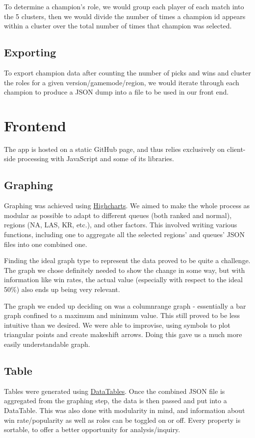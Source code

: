\documentclass{article}
\begin{document}
To determine a champion's role,  we would group each player of each match into the 5 clusters, then we would divide the number of times a champion id appears within a cluster over the total number of times that champion was selected.

\subsection{Exporting}
To export champion data after counting the number of picks and wins and cluster the roles for a given version/gamemode/region, we would iterate through each champion to produce a JSON dump into a file to be used in our front end.


\section{Frontend}
The app is hosted on a static GitHub page, and thus relies exclusively on client-side processing with JavaScript and some of its libraries.

\subsection{Graphing}
Graphing was achieved using \href{http://www.highcharts.com/}{Highcharts}. We aimed to make the whole process as modular as possible to adapt to different queues (both ranked and normal), regions (NA, LAS, KR, etc.), and other factors. This involved writing various functions, including one to aggregate all the selected regions' and queues' JSON files into one combined one.

Finding the ideal graph type to represent the data proved to be quite a challenge. The graph we chose definitely needed to show the change in some way, but with information like win rates, the actual value (especially with respect to the ideal 50\%) also ends up being very relevant. 

The graph we ended up deciding on was a columnrange graph - essentially a bar graph confined to a maximum and minimum value. This still proved to be less intuitive than we desired. We were able to improvise, using symbols to plot triangular points and create makeshift arrows. Doing this gave us a much more easily understandable graph.

\subsection{Table}
Tables were generated using \href{https://www.datatables.net/}{DataTables}. Once the combined JSON file is aggregated from the graphing step, the data is then passed and put into a DataTable. This was also done with modularity in mind, and information about win rate/popularity as well as roles can be toggled on or off. Every property is sortable, to offer a better opportunity for analysis/inquiry.
\end{document}
